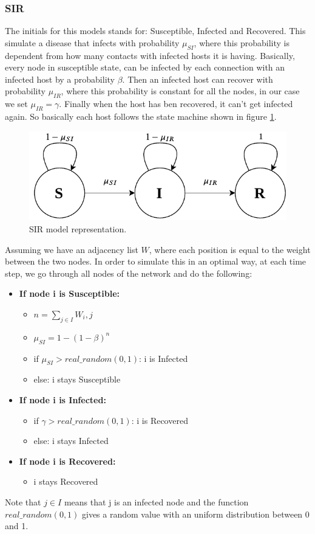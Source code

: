 \subsubsection{SIR}
The initials for this models stands for: Susceptible, Infected and Recovered. This simulate a disease that infects with probability $\mu_{SI}$, where this probability is dependent from how many contacts with infected hosts it is having. Basically, every node in susceptible state, can be infected by each connection with an infected host by a probability $\beta$. Then an infected host can recover with probability $\mu_{IR}$, where this probability is constant for all the nodes, in our case we set $\mu_{IR}=\gamma$. Finally when the host has ben recovered, it can't get infected again. So basically each host follows the state machine shown in figure \ref{fig:sir}.
\begin{figure}[htbp]
    \centering
    \includegraphics[width=\linewidth]{../img/SIR_model.pdf}
    \caption{SIR model representation.}
    \label{fig:sir}
\end{figure}

Assuming we have an adjacency list $W$, where each position is equal to the weight between the two nodes. In order to simulate this in an optimal way, at each time step, we go through all nodes of the network and do the following:
\begin{itemize}
    \item \textbf{If node i is Susceptible:} 
    \begin{itemize}
        \item[] $n=\sum_{j\in I}W_i,j$
        \item[] $\mu_{SI}=1-(1-\beta)^n$
        \item[] if $\mu_{SI}>real\_random(0,1)$: i is Infected
        \item[] else: i stays Susceptible  
    \end{itemize}
    \item \textbf{If node i is Infected:} 
    \begin{itemize}
        \item[] if $\gamma>real\_random(0,1)$: i is Recovered
        \item[] else: i stays Infected
    \end{itemize}
    \item \textbf{If node i is Recovered:} 
    \begin{itemize}
        \item[] i stays Recovered
    \end{itemize}
\end{itemize}
Note that $j\in I$ means that j is an infected node and the function $real\_random(0,1)$ gives a random value with an uniform distribution between 0 and 1.
